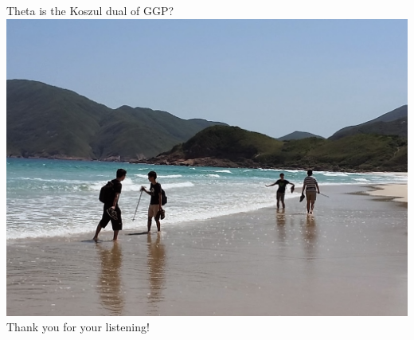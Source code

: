 \documentclass[t,mathserif,11pt,usenames,dvipsnames]{beamer}
\theoremstyle{plain}
\theoremstyle{definition}
\begin{document}
\begin{frame}{Theta is the Koszul dual of GGP?}
\centering
    \includegraphics[width=\textwidth]{Hiking}\\
    \vspace{-12.8em}
    {\color{white} \Huge Thank you for your listening!}
\end{frame}


\def\VV{{\mathbb{V}}}
\def\tcNV{{\widetilde\cN}_\VV}
\def\tcN{{\widetilde{\cN}}}
\def\Flag{{\mathrm{Fl}}}
\end{document}
